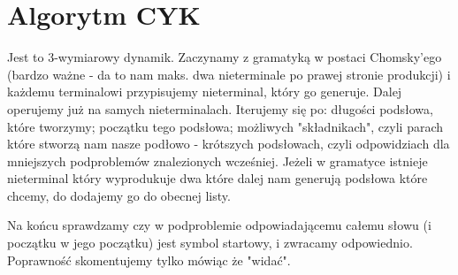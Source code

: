 \section{Algorytm CYK}

Jest to 3-wymiarowy dynamik. Zaczynamy z gramatyką w postaci Chomsky'ego (bardzo ważne - da to nam maks. dwa nieterminale po prawej stronie produkcji) i każdemu terminalowi przypisujemy nieterminal, który go generuje. Dalej operujemy już na samych nieterminalach. Iterujemy się po: długości podsłowa, które tworzymy; początku tego podsłowa; możliwych "składnikach", czyli parach które stworzą nam nasze podłowo - krótszych podsłowach, czyli odpowidziach dla mniejszych podproblemów znalezionych wcześniej. Jeżeli w gramatyce istnieje nieterminal który wyprodukuje dwa które dalej nam generują podsłowa które chcemy, do dodajemy go do obecnej listy.

Na końcu sprawdzamy czy w podproblemie odpowiadającemu całemu słowu (i początku w jego początku) jest symbol startowy, i zwracamy odpowiednio. Poprawność skomentujemy tylko mówiąc że "widać".